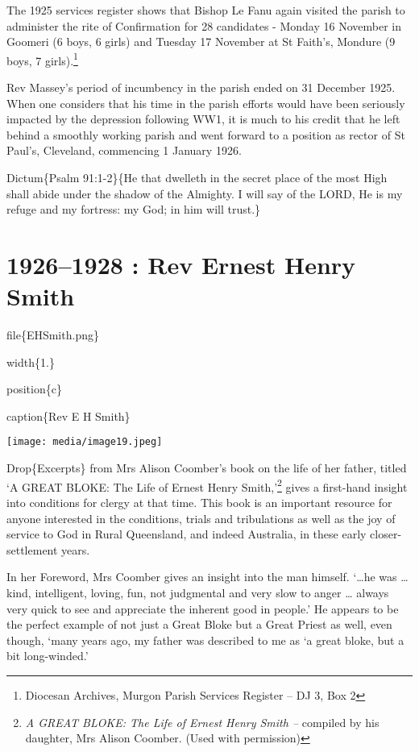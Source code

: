 The 1925 services register shows that Bishop Le Fanu again visited the parish to administer the rite of Confirmation for 28 candidates - Monday 16 November in Goomeri (6 boys, 6 girls) and Tuesday 17 November at St Faith's, Mondure (9 boys, 7 girls).\footnote{Diocesan Archives, Murgon Parish Services Register -- DJ 3, Box 2}

Rev Massey's period of incumbency in the parish ended on 31 December 1925. When one considers that his time in the parish efforts would have been seriously impacted by the depression following WW1, it is much to his credit that he left behind a smoothly working parish and went forward to a position as rector of St Paul's, Cleveland, commencing 1 January 1926.

Dictum\{Psalm 91:1-2\}\{He that dwelleth in the secret place of the most High shall abide under the shadow of the Almighty. I will say of the LORD, He is my refuge and my fortress: my God; in him will trust.\}

\hypertarget{rev-ernest-henry-smith}{%
\chapter{1926--1928 : Rev Ernest Henry Smith}\label{rev-ernest-henry-smith}}

file\{EHSmith.png\}

width\{1.\}

position\{c\}

caption\{Rev E H Smith\}

\texttt{[image: media/image19.jpeg]}

Drop\{Excerpts\} from Mrs Alison Coomber's book on the life of her father, titled `A GREAT BLOKE: The Life of Ernest Henry Smith,'\footnote{\emph{A GREAT BLOKE: The Life of Ernest Henry Smith --} compiled by his daughter, Mrs Alison Coomber. (Used with permission)} gives a first-hand insight into conditions for clergy at that time. This book is an important resource for anyone interested in the conditions, trials and tribulations as well as the joy of service to God in Rural Queensland, and indeed Australia, in these early closer-settlement years.

In her Foreword, Mrs Coomber gives an insight into the man himself. `\ldots he was \ldots{} kind, intelligent, loving, fun, not judgmental and very slow to anger \ldots{} always very quick to see and appreciate the inherent good in people.' He appears to be the perfect example of not just a Great Bloke but a Great Priest as well, even though, `many years ago, my father was described to me as `a great bloke, but a bit long-winded.'

